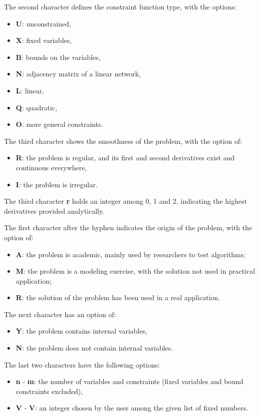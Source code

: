 The second character defines the constraint function type, with the options: 
\begin{itemize}  \itemsep -8pt 
\item  \textbf{U}: unconstrained,
\item  \textbf{X}: fixed variables, 
\item  \textbf{B}: bounds on the variables,
\item  \textbf{N}: adjacency matrix of a linear network,
\item  \textbf{L}: linear, 
\item  \textbf{Q}: quadratic,
\item  \textbf{O}: more general constraints. 
\end{itemize}

The third character shows the smoothness of the problem, with the option of:
\begin{itemize}  \itemsep -8pt 
\item \textbf{R}: the problem is regular, and its first and second derivatives exist and continuous everywhere,
\item \textbf{I}: the problem is irregular.
\end{itemize}

The third character \textbf{r} holds an integer among 0, 1 and 2, indicating the highest derivatives provided analytically.

The first character after the hyphen indicates the origin of the problem, with the option of:
\begin{itemize}  \itemsep -8pt 
\item  \textbf{A}: the problem is academic, mainly used by researchers to test algorithms; 
\item  \textbf{M}: the problem is a modeling exercise, with the solution not used in practical application; 
\item  \textbf{R}: the solution of the problem has been used in a real application.  
\end{itemize}

The next character has an option of: 
\begin{itemize}  \itemsep -8pt 
\item \textbf{Y}: the problem contains internal variables, 
\item \textbf{N}: the problem does not contain internal variables. 
\end{itemize}

The last two characters have the following options:
\begin{itemize}  \itemsep -8pt 
\item \textbf{n} - \textbf{m}: the number of variables and constraints (fixed variables and bound constraints excluded), 
\item \textbf{V} - \textbf{V}: an integer chosen by the user among the given list of fixed numbers.
\end{itemize}

